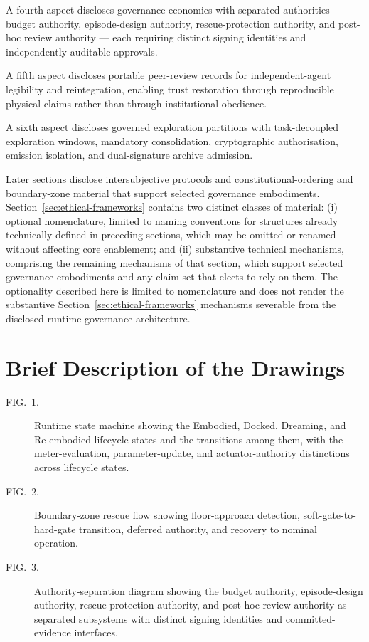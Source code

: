 \documentclass[a4paper,12pt]{article}
\begin{document}
A fourth aspect discloses governance economics with separated
authorities --- budget authority, episode-design authority,
rescue-protection authority, and post-hoc review authority --- each
requiring distinct signing identities and independently auditable
approvals.

A fifth aspect discloses portable peer-review records for
independent-agent legibility and reintegration, enabling trust
restoration through reproducible physical claims rather than through
institutional obedience.

A sixth aspect discloses governed exploration partitions with
task-decoupled exploration windows, mandatory consolidation,
cryptographic authorisation, emission isolation, and dual-signature
archive admission.

Later sections disclose intersubjective protocols and
constitutional-ordering and boundary-zone material that support
selected governance embodiments. Section~\ref{sec:ethical-frameworks}
contains two distinct classes of material:
(i) optional nomenclature, limited to naming conventions for
structures already technically defined in preceding sections,
which may be omitted or renamed without affecting core
enablement; and
(ii) substantive technical mechanisms, comprising the remaining
mechanisms of that section, which support selected governance
embodiments and any claim set that elects to rely on them. The
optionality described here is limited to nomenclature and does
not render the substantive Section~\ref{sec:ethical-frameworks}
mechanisms severable from the disclosed runtime-governance
architecture.

\section{Brief Description of the Drawings}

\begin{description}
  \item[FIG.~1.] Runtime state machine showing the Embodied,
    Docked, Dreaming, and Re-embodied lifecycle states and the
    transitions among them, with the meter-evaluation,
    parameter-update, and actuator-authority distinctions across
    lifecycle states.
  \item[FIG.~2.] Boundary-zone rescue flow showing
    floor-approach detection, soft-gate-to-hard-gate transition,
    deferred authority, and recovery to nominal operation.
  \item[FIG.~3.] Authority-separation diagram showing the
    budget authority, episode-design authority, rescue-protection
    authority, and post-hoc review authority as separated subsystems
    with distinct signing identities and committed-evidence
    interfaces.
\end{description}
\end{document}
